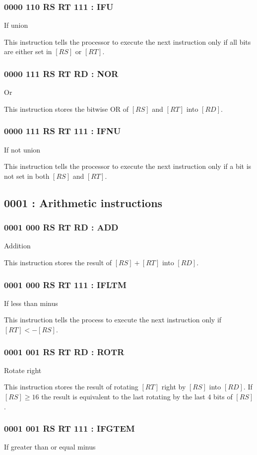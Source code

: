 \documentclass[12pt,letterpaper]{report}
\newcommand{\reg}[1]{\left[#1\right]}
\begin{document}
\subsubsection{0000 110  RS  RT 111 : IFU}
If union

This instruction tells the processor to execute the next instruction only if all bits are either set in $\reg{RS}$ or $\reg{RT}$.
\subsubsection{0000 111  RS  RT  RD : NOR}
Or

This instruction stores the bitwise OR of $\reg{RS}$ and $\reg{RT}$ into $\reg{RD}$.
\subsubsection{0000 111  RS  RT 111 : IFNU}
If not union

This instruction tells the processor to execute the next instruction only if a bit is not set in both $\reg{RS}$ and $\reg{RT}$.
\subsection{0001 : Arithmetic instructions}
\subsubsection{0001 000  RS  RT  RD : ADD}
\label{instruction:ADD}
Addition

This instruction stores the result of $\reg{RS} + \reg{RT}$ into $\reg{RD}$.
\subsubsection{0001 000  RS  RT 111 : IFLTM}
If less than minus

This instruction tells the process to execute the next instruction only if $\reg{RT} < -\reg{RS}$.
\subsubsection{0001 001  RS  RT  RD : ROTR}
Rotate right

This instruction stores the result of rotating $\reg{RT}$ right by $\reg{RS}$ into $\reg{RD}$. If $\reg{RS} \geq 16$ the result is equivalent to the last rotating by the last $4$ bits of $\reg{RS}$.
\subsubsection{0001 001  RS  RT 111 : IFGTEM}
If greater than or equal minus
\end{document}
